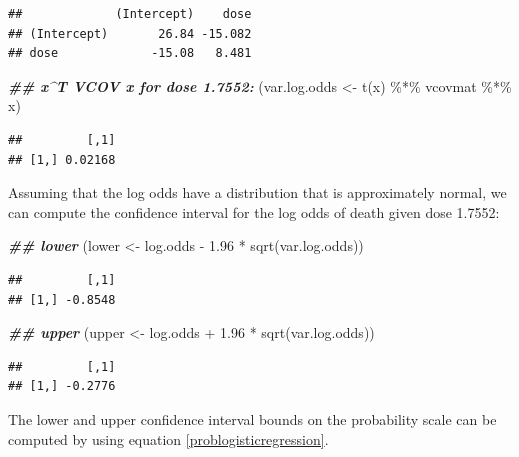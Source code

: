 \documentclass[
  12pt,
]{krantz}
\newenvironment{Shaded}{\begin{snugshade}}{\end{snugshade}}
\newcommand{\DocumentationTok}[1]{\textcolor[rgb]{0.56,0.35,0.01}{\textbf{\textit{#1}}}}
\newcommand{\FloatTok}[1]{\textcolor[rgb]{0.00,0.00,0.81}{#1}}
\newcommand{\FunctionTok}[1]{\textcolor[rgb]{0.00,0.00,0.00}{#1}}
\newcommand{\NormalTok}[1]{#1}
\newcommand{\OtherTok}[1]{\textcolor[rgb]{0.56,0.35,0.01}{#1}}
\newcommand{\SpecialCharTok}[1]{\textcolor[rgb]{0.00,0.00,0.00}{#1}}
\theoremstyle{definition}
\theoremstyle{definition}
\theoremstyle{definition}
\theoremstyle{definition}
\theoremstyle{remark}
\begin{document}
\begin{verbatim}
##             (Intercept)    dose
## (Intercept)       26.84 -15.082
## dose             -15.08   8.481
\end{verbatim}

\begin{Shaded}
\begin{Highlighting}[]
\DocumentationTok{\#\# x\^{}T VCOV x for dose 1.7552:}
\NormalTok{(var.log.odds }\OtherTok{\textless{}{-}} \FunctionTok{t}\NormalTok{(x) }\SpecialCharTok{\%*\%}\NormalTok{ vcovmat }\SpecialCharTok{\%*\%}\NormalTok{ x)}
\end{Highlighting}
\end{Shaded}

\begin{verbatim}
##         [,1]
## [1,] 0.02168
\end{verbatim}

Assuming that the log odds have a distribution that is approximately normal, we can compute the confidence interval for the log odds
of death given dose 1.7552:

\begin{Shaded}
\begin{Highlighting}[]
\DocumentationTok{\#\# lower}
\NormalTok{(lower }\OtherTok{\textless{}{-}}\NormalTok{ log.odds }\SpecialCharTok{{-}} \FloatTok{1.96} \SpecialCharTok{*} \FunctionTok{sqrt}\NormalTok{(var.log.odds))}
\end{Highlighting}
\end{Shaded}

\begin{verbatim}
##         [,1]
## [1,] -0.8548
\end{verbatim}

\begin{Shaded}
\begin{Highlighting}[]
\DocumentationTok{\#\# upper}
\NormalTok{(upper }\OtherTok{\textless{}{-}}\NormalTok{ log.odds }\SpecialCharTok{+} \FloatTok{1.96} \SpecialCharTok{*} \FunctionTok{sqrt}\NormalTok{(var.log.odds))}
\end{Highlighting}
\end{Shaded}

\begin{verbatim}
##         [,1]
## [1,] -0.2776
\end{verbatim}

The lower and upper confidence interval bounds on the
probability scale can be computed by
using equation \ref{problogisticregression}.
\end{document}
